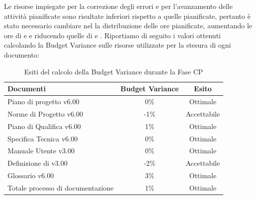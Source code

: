 Le risorse impiegate per la correzione degli errori e per l'avanzamento delle attività pianificate sono risultate inferiori rispetto a quelle pianificate, pertanto è stato necessario cambiare nel  la distribuzione delle ore pianificate, aumentando le ore di  e  e riducendo quelle di  e .
Riportiamo di seguito i valori ottenuti calcolando la Budget Variance sulle risorse utilizzate per la stesura di ogni documento:
			\begin{table}[H]
					\centering
					\begin{tabu}{| l | c | c |}
							\hline
							Documenti 							& Budget Variance	& Esito		\\ \hline \hline
							
							Piano di progetto v6.00				& 0\% 		& Ottimale  \\ \hline
							Norme di Progetto v6.00 			& -1\%		& Accettabile  \\ \hline
							Piano di Qualifica v6.00 			& 1\%		& Ottimale  \\ \hline
							Specifica Tecnica v6.00 			& 0\%		& Ottimale  \\ \hline
							Manuale Utente v3.00 			& 0\%		& Ottimale  \\ \hline
							Definizione di  v3.00 			& -2\%		& Accettabile  \\ \hline
							Glossario v6.00					 	& 3\% 		& Ottimale  \\ \hline
							Totale processo di documentazione & 1\% & Ottimale \\ \hline
						\end{tabu}
					\caption{Esiti del calcolo della Budget Variance durante la Fase CP}
				\end{table}
				
